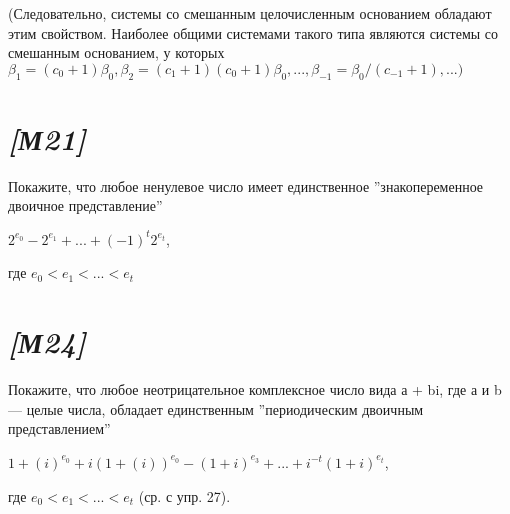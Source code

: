 

\newpage
{}
\setcounter{secnumdepth}{10}

(Следовательно, системы со смешанным целочисленным основанием обладают этим свойством. Наиболее общими системами такого типа являются системы со смешанным основанием, у которых $\beta_{1} = (c_{0} + 1)\beta_{0}, \beta_{2} = (c_{1} + 1)(c_{0} + 1)\beta_{0}, ..., \beta_{-1} = \beta_{0}/(c_{-1} + 1), ...)$

\section{\textit{[М21]}}
Покажите, что любое ненулевое число имеет единственное ''знакопеременное двоичное представление''
\begin{center}
$2^{e_{0}} - 2 ^{e_{1}} + ... + (-1)^{t}2^{e_{t}}$,
\end{center}
где $e_{0} < e_{1} < ... < e_{t}$

\section{\textit{[М24]}}
Покажите, что любое неотрицательное комплексное число вида а + bi, где а и b — целые числа, обладает единственным ''периодическим двоичным представлением''
\begin{center}
$1+(i)^{e_{0}} + i(1 + (i))^{e_{0}} - (1 + i)^{e_{3}} + ... + i^{-t}(1+i)^{e_{t}}$,
\end{center}
где $e_{0} < e_{1} < ... < e_{t}$ (ср. с упр. 27).
